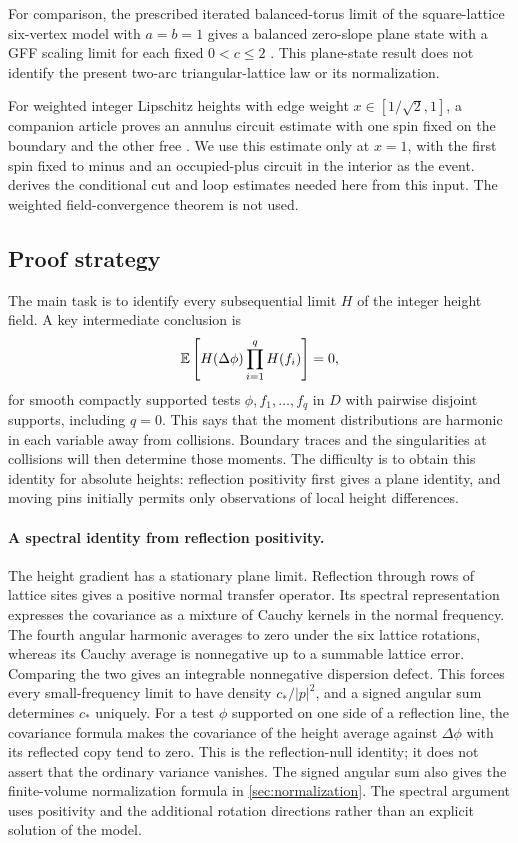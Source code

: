 For comparison, the prescribed iterated balanced-torus limit of the
square-lattice six-vertex model with $a=b=1$ gives a balanced zero-slope
plane state with a GFF scaling limit for each fixed $0<c\le2$
\cite[Theorem~1.1]{OpenAIBalancedSixVertex2026}.
This plane-state result does not identify the present two-arc
triangular-lattice law or its normalization.

For weighted integer Lipschitz heights with edge weight
$x\in[1/\sqrt2,1]$, a companion article proves an annulus circuit estimate
with one spin fixed on the boundary and the other free
\cite[Theorem~2.3]{OpenAIWeighted2026}.
We use this estimate only at $x=1$, with the first spin fixed to minus
and an occupied-plus circuit in the interior as the event.
 derives the conditional cut and loop estimates needed here
from this input.  The weighted field-convergence theorem is not used.

\subsection{Proof strategy}

The main task is to identify every subsequential limit $H$ of the integer
height field.  A key intermediate conclusion is
\begin{equation}\label{eq:strategy-harmonicity}
 \mathbb E\left[H(\Delta\phi)\prod_{i=1}^qH(f_i)\right]=0,
\end{equation}
for smooth compactly supported tests $\phi,f_1,\ldots,f_q$ in $D$ with
pairwise disjoint supports, including $q=0$.  This says that the moment
distributions are harmonic in each variable away from collisions.  Boundary
traces and the singularities at collisions will then determine those moments.
The difficulty is to obtain this identity for absolute heights: reflection
positivity first gives a plane identity, and moving pins initially permits
only observations of local height differences.

\paragraph{A spectral identity from reflection positivity.}
The height gradient has a stationary plane limit.  Reflection through rows
of lattice sites gives a positive normal transfer operator.  Its spectral
representation expresses the covariance as a mixture of Cauchy kernels
in the normal frequency.  The fourth angular harmonic averages to zero
under the six lattice rotations, whereas its Cauchy average is nonnegative
up to a summable lattice error.  Comparing the two gives an integrable
nonnegative dispersion defect.  This forces every small-frequency limit to have density
$c_*/|p|^2$, and a signed angular sum determines $c_*$ uniquely.
For a test $\phi$ supported on one side of a reflection line, the covariance
formula makes the covariance of the height average against $\Delta\phi$
with its reflected copy tend to zero.  This is the reflection-null identity;
it does not assert that the ordinary variance vanishes.  The signed angular
sum also gives the finite-volume normalization formula in
\cref{sec:normalization}.  The spectral argument uses positivity and the
additional rotation directions rather than an explicit solution of the model.

